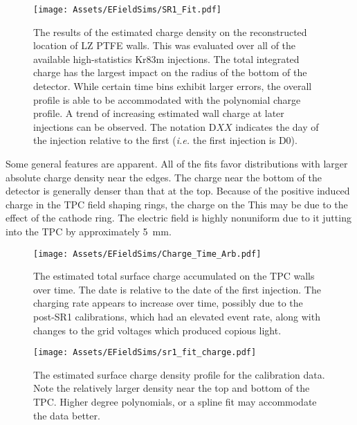 \begin{figure}
    \centering
    \texttt{[image: Assets/EFieldSims/SR1\_Fit.pdf]}
    \caption[The results of the estimated charge density on the reconstructed location of LZ PTFE walls.]%
    {
    The results of the estimated charge density on the reconstructed location of LZ PTFE walls.
    This was evaluated over all of the available high-statistics Kr83m injections. 
    The total integrated charge has the largest impact on the radius of the bottom of the detector.
    While certain time bins exhibit larger errors, the overall profile is able to be accommodated with the polynomial charge profile.
    A trend of increasing estimated wall charge at later injections can be observed.
    The notation D$XX$ indicates the day of the injection relative to the first (\textit{i.e.} the first injection is D0).}
    \label{fig:sr1_charge_fit_profile}
\end{figure}

Some general features are apparent.
All of the fits favor distributions with larger absolute charge density near the edges.
The charge near the bottom of the detector is generally denser than that at the top.
Because of the positive induced charge in the TPC field shaping rings, the charge on the 
This may be due to the effect of the cathode ring.
The electric field is highly nonuniform due to it jutting into the TPC by approximately 5~mm. 

\begin{figure}
    \centering
    \texttt{[image: Assets/EFieldSims/Charge\_Time\_Arb.pdf]}
       \caption[ The estimated total surface charge accumulated on the TPC walls over time.]%
       {The estimated total surface charge accumulated on the TPC walls over time.
       The date is relative to the date of the first injection.
       The charging rate appears to increase over time, possibly due to the post-SR1 calibrations, which had an elevated event rate, along with changes to the grid voltages which produced copious light.
     }
    \label{fig:charge_over_time}
\end{figure}

\begin{figure}
    \centering
       \texttt{[image: Assets/EFieldSims/sr1\_fit\_charge.pdf]}
       \caption[ The estimated surface charge density profile for the calibration data.]%
       {
        The estimated surface charge density profile for the calibration data.
        Note the relatively larger density near the top and bottom of the TPC.
        Higher degree polynomials, or a spline fit may accommodate the data better.}
    \label{fig:charge_over_time_profiles}
\end{figure}

